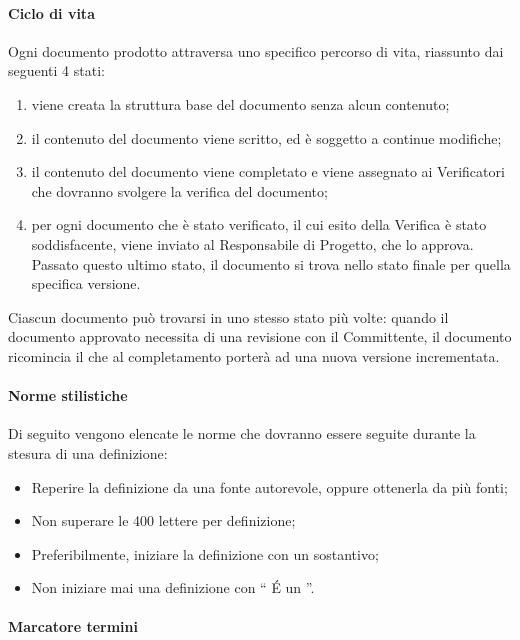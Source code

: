 \paragraph{Ciclo di vita}
Ogni documento prodotto attraversa uno specifico percorso di vita, riassunto dai seguenti 4 stati:
\begin{enumerate}
\item {}viene creata la struttura base del documento senza alcun contenuto;
\item {}il contenuto del documento viene scritto, ed è soggetto a continue modifiche;
\item {}il contenuto del documento viene completato e viene assegnato ai Verificatori che dovranno svolgere la verifica del documento;
\item {}per ogni documento che è stato verificato, il cui esito della Verifica è stato soddisfacente, viene inviato al Responsabile di Progetto, che lo approva. Passato questo ultimo stato, il documento si trova nello stato finale per quella specifica versione.
\end{enumerate}

Ciascun documento può trovarsi in uno stesso stato più volte: quando il documento approvato necessita di una revisione con il Committente, il documento ricomincia il  che al completamento porterà ad una nuova versione incrementata.
\newpage


\paragraph{Norme stilistiche}
\label{7.2}
Di seguito vengono elencate le norme che dovranno essere seguite durante la stesura di una definizione:
\begin{itemize}
\item Reperire la definizione da una fonte autorevole, oppure ottenerla da più fonti;
\item Non superare le 400 lettere per definizione;
\item Preferibilmente, iniziare la definizione con un sostantivo;
\item Non iniziare mai una definizione con `` \'E un ''.
\end{itemize}

\paragraph{Marcatore termini}

